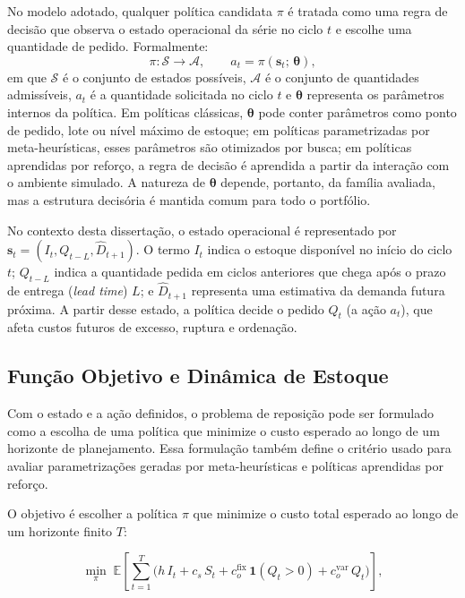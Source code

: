 No modelo adotado, qualquer política candidata $\pi$ é tratada como uma regra de decisão que observa o estado operacional da série no ciclo $t$ e escolhe uma quantidade de pedido. Formalmente:
\[
  \pi: \mathcal{S} \rightarrow \mathcal{A}, \qquad a_t = \pi(\mathbf{s}_t;\, \boldsymbol{\theta}),
\]
em que $\mathcal{S}$ é o conjunto de estados possíveis, $\mathcal{A}$ é o conjunto de quantidades admissíveis, $a_t$ é a quantidade solicitada no ciclo $t$ e $\boldsymbol{\theta}$ representa os parâmetros internos da política. Em políticas clássicas, $\boldsymbol{\theta}$ pode conter parâmetros como ponto de pedido, lote ou nível máximo de estoque; em políticas parametrizadas por meta-heurísticas, esses parâmetros são otimizados por busca; em políticas aprendidas por reforço, a regra de decisão é aprendida a partir da interação com o ambiente simulado. A natureza de $\boldsymbol{\theta}$ depende, portanto, da família avaliada, mas a estrutura decisória é mantida comum para todo o portfólio.

No contexto desta dissertação, o estado operacional é representado por $\mathbf{s}_t = (I_t, Q_{t-L}, \hat{D}_{t+1})$. O termo $I_t$ indica o estoque disponível no início do ciclo $t$; $Q_{t-L}$ indica a quantidade pedida em ciclos anteriores que chega após o prazo de entrega (\textit{lead time}) $L$; e $\hat{D}_{t+1}$ representa uma estimativa da demanda futura próxima. A partir desse estado, a política decide o pedido $Q_t$ (a ação $a_t$), que afeta custos futuros de excesso, ruptura e ordenação.

\subsection{Função Objetivo e Dinâmica de Estoque}
\label{sec:funcao_objetivo}

Com o estado e a ação definidos, o problema de reposição pode ser formulado como a escolha de uma política que minimize o custo esperado ao longo de um horizonte de planejamento. Essa formulação também define o critério usado para avaliar parametrizações geradas por meta-heurísticas e políticas aprendidas por reforço.

O objetivo é escolher a política $\pi$ que minimize o custo total esperado ao longo de um horizonte finito $T$:

\begin{equation}
  \min_\pi \; \mathbb{E}\left[\sum_{t=1}^{T} \bigl(h\,I_t + c_s\,S_t + c_o^{\text{fix}}\,\mathbf{1}(Q_t>0) + c_o^{\text{var}}\,Q_t\bigr)\right],
  \label{eq:obj_inv_control}
\end{equation}


